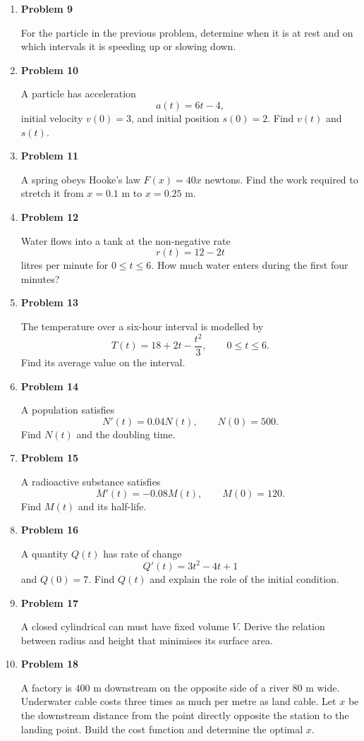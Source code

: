 \begin{enumerate}
\item \textbf{Problem 9}\par
For the particle in the previous problem, determine when it is at rest and on which intervals it is speeding up or slowing down.

\item \textbf{Problem 10}\par
A particle has acceleration
\[
a(t)=6t-4,
\]
initial velocity \(v(0)=3\), and initial position \(s(0)=2\). Find \(v(t)\) and \(s(t)\).

\item \textbf{Problem 11}\par
A spring obeys Hooke's law \(F(x)=40x\) newtons. Find the work required to stretch it from \(x=0.1\) m to \(x=0.25\) m.

\item \textbf{Problem 12}\par
Water flows into a tank at the non-negative rate
\[
r(t)=12-2t
\]
litres per minute for \(0\le t\le6\). How much water enters during the first four minutes?

\item \textbf{Problem 13}\par
The temperature over a six-hour interval is modelled by
\[
T(t)=18+2t-\frac{t^2}{3},\qquad 0\le t\le6.
\]
Find its average value on the interval.

\item \textbf{Problem 14}\par
A population satisfies
\[
N'(t)=0.04N(t),
\qquad
N(0)=500.
\]
Find \(N(t)\) and the doubling time.

\item \textbf{Problem 15}\par
A radioactive substance satisfies
\[
M'(t)=-0.08M(t),
\qquad
M(0)=120.
\]
Find \(M(t)\) and its half-life.

\item \textbf{Problem 16}\par
A quantity \(Q(t)\) has rate of change
\[
Q'(t)=3t^2-4t+1
\]
and \(Q(0)=7\). Find \(Q(t)\) and explain the role of the initial condition.

\item \textbf{Problem 17}\par
A closed cylindrical can must have fixed volume \(V\). Derive the relation between radius and height that minimises its surface area.

\item \textbf{Problem 18}\par
A factory is \(400\) m downstream on the opposite side of a river \(80\) m wide. Underwater cable costs three times as much per metre as land cable. Let \(x\) be the downstream distance from the point directly opposite the station to the landing point. Build the cost function and determine the optimal \(x\).


\end{enumerate}
